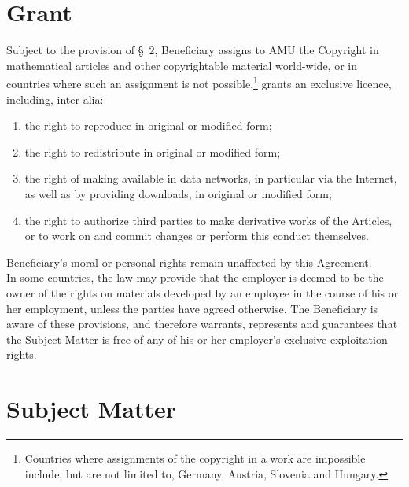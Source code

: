 \section{Grant}
\A Subject to the provision of {\S}~2, Beneficiary assigns to AMU the
Copyright in mathematical articles and other copyrightable material
world-wide, or in countries where such an assignment is not
possible,\footnote{Countries where assignments of the copyright in a
work are impossible include, but are not limited to, Germany, Austria,
Slovenia and Hungary.} grants an exclusive licence, including, inter
alia:
\begin{enumerate}
\item the right to reproduce in original or modified form;
\item the right to redistribute in original or modified form;
\item the right of making available in data networks, in particular
  via the Internet, as well as by providing downloads, in original or
  modified form;
\item the right to authorize third parties to make derivative works of
  the Articles, or to work on and commit changes or perform this
  conduct themselves.
\end{enumerate}
\A Beneficiary's moral or personal rights remain unaffected by this
Agreement.\\ 
\A In some countries, the law may provide that the employer is deemed
to be the owner of the rights on materials developed by an employee in
the course of his or her employment, unless the parties have agreed
otherwise. The Beneficiary is aware of these provisions, and therefore
warrants, represents and guarantees that the Subject Matter is free of
any of his or her employer's exclusive exploitation rights.

\section{Subject Matter}

